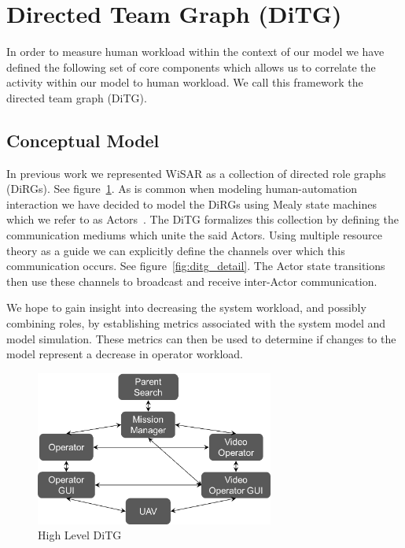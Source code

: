 \section{Directed Team Graph (DiTG)}

In order to measure human workload within the context of our model \cite{gledhill2013modelinguas} we
have defined the following set of core components which allows us to correlate
the activity within our model to human workload.  We call this framework the
directed team graph (DiTG).

\subsection{Conceptual Model}
In previous work we represented WiSAR as a collection of directed role graphs
(DiRGs)\cite{gledhill2013modelinguas}.  See figure~\ref{fig:ditg}.  As is common
when modeling human-automation interaction we have decided to model the DiRGs
using Mealy state machines which we refer to as
Actors~\cite{bolton2013litreview}.
The DiTG formalizes this collection by defining the communication mediums which
unite the said Actors.  Using multiple resource theory\cite{wickens2002multiple}
as a guide we can explicitly define the channels over which this communication occurs.  See
figure~\ref{fig:ditg_detail}.  The Actor state transitions then use these
channels to broadcast and receive inter-Actor communication.  

We hope to gain
insight into decreasing the system workload, and possibly combining roles, by
establishing metrics associated with the system model and model simulation. 
These metrics can then be used to determine if changes to the model represent a
decrease in operator workload.

\begin{figure}
\center
\setlength{\abovecaptionskip}{1mm}
\setlength{\belowcaptionskip}{1mm}
\setlength{\textfloatsep}{1mm}
\setlength{\floatsep}{1mm}
\includegraphics[height=2in]{ditg.png}
\caption{High Level DiTG}
\label{fig:ditg}
\end{figure}

